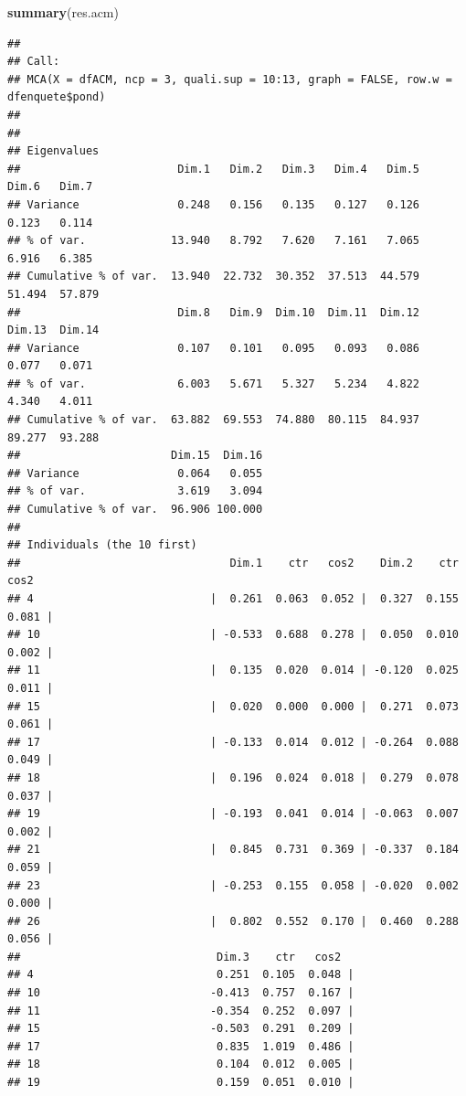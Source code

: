 \documentclass[
  11pt,
  french,
]{book}
\makeatletter
\newenvironment{Shaded}{\begin{snugshade}}{\end{snugshade}}
\newcommand{\KeywordTok}[1]{\textcolor[rgb]{0.13,0.29,0.53}{\textbf{#1}}}
\newcommand{\NormalTok}[1]{#1}
\newenvironment{kframe}{%
\medskip{}
\setlength{\fboxsep}{.8em}
 \def\at@end@of@kframe{}%
 \ifinner\ifhmode%
  \def\at@end@of@kframe{\end{minipage}}%
  \begin{minipage}{\columnwidth}%
 \fi\fi%
 \def\FrameCommand##1{\hskip\@totalleftmargin \hskip-\fboxsep
 \colorbox{shadecolor}{##1}\hskip-\fboxsep
     \hskip-\linewidth \hskip-\@totalleftmargin \hskip\columnwidth}%
 \MakeFramed {\advance\hsize-\width
   \@totalleftmargin\z@ \linewidth\hsize
   \@setminipage}}%
 {\par\unskip\endMakeFramed%
 \at@end@of@kframe}
\renewenvironment{Shaded}{\begin{kframe}}{\end{kframe}}
\makeatother
\begin{document}
\begin{Shaded}
\begin{Highlighting}[]
\KeywordTok{summary}\NormalTok{(res.acm)}
\end{Highlighting}
\end{Shaded}

\begin{verbatim}
## 
## Call:
## MCA(X = dfACM, ncp = 3, quali.sup = 10:13, graph = FALSE, row.w = dfenquete$pond) 
## 
## 
## Eigenvalues
##                        Dim.1   Dim.2   Dim.3   Dim.4   Dim.5   Dim.6   Dim.7
## Variance               0.248   0.156   0.135   0.127   0.126   0.123   0.114
## % of var.             13.940   8.792   7.620   7.161   7.065   6.916   6.385
## Cumulative % of var.  13.940  22.732  30.352  37.513  44.579  51.494  57.879
##                        Dim.8   Dim.9  Dim.10  Dim.11  Dim.12  Dim.13  Dim.14
## Variance               0.107   0.101   0.095   0.093   0.086   0.077   0.071
## % of var.              6.003   5.671   5.327   5.234   4.822   4.340   4.011
## Cumulative % of var.  63.882  69.553  74.880  80.115  84.937  89.277  93.288
##                       Dim.15  Dim.16
## Variance               0.064   0.055
## % of var.              3.619   3.094
## Cumulative % of var.  96.906 100.000
## 
## Individuals (the 10 first)
##                                Dim.1    ctr   cos2    Dim.2    ctr   cos2  
## 4                           |  0.261  0.063  0.052 |  0.327  0.155  0.081 |
## 10                          | -0.533  0.688  0.278 |  0.050  0.010  0.002 |
## 11                          |  0.135  0.020  0.014 | -0.120  0.025  0.011 |
## 15                          |  0.020  0.000  0.000 |  0.271  0.073  0.061 |
## 17                          | -0.133  0.014  0.012 | -0.264  0.088  0.049 |
## 18                          |  0.196  0.024  0.018 |  0.279  0.078  0.037 |
## 19                          | -0.193  0.041  0.014 | -0.063  0.007  0.002 |
## 21                          |  0.845  0.731  0.369 | -0.337  0.184  0.059 |
## 23                          | -0.253  0.155  0.058 | -0.020  0.002  0.000 |
## 26                          |  0.802  0.552  0.170 |  0.460  0.288  0.056 |
##                              Dim.3    ctr   cos2  
## 4                            0.251  0.105  0.048 |
## 10                          -0.413  0.757  0.167 |
## 11                          -0.354  0.252  0.097 |
## 15                          -0.503  0.291  0.209 |
## 17                           0.835  1.019  0.486 |
## 18                           0.104  0.012  0.005 |
## 19                           0.159  0.051  0.010 |

\end{verbatim}
\end{document}
